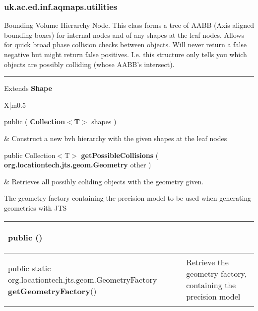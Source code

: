 \subsubsection*{ uk.ac.ed.inf.aqmaps.utilities }
 {\scriptsize Bounding Volume Hierarchy Node. This class forms a tree of AABB (Axis aligned bounding boxes) for internal nodes\newline%
 and of any shapes at the leaf nodes. Allows for quick broad phase collision checks between objects. Will never return a false negative but might return\newline%
 false positives. I.e. this structure only tells you which objects are possibly colliding (whose AABB's intersect).
 
\vspace*{4pt} \hrule \vspace*{3pt}
Extends \textbf{ Shape }
\vspace*{-5pt} 
\begin{tabularx}{\linewidth}{X|m{0.5\textwidth}}
\label{tab:BVHNode}
\begin{raggedleft}public  \textbf{\hyperref[tab:BVHNode]{\color{blue}{BVHNode}} }(\hspace*{ 5pt} \textbf{Collection$<$T$>$} shapes  )
\end{raggedleft} &
 Construct a new bvh hierarchy with the given shapes at the leaf nodes\\ \hline 
\begin{raggedleft}public Collection$<$T$>$ \textbf{getPossibleCollisions }(\hspace*{ 5pt} \textbf{org.locationtech.jts.geom.Geometry} other  )
\end{raggedleft} &
 Retrieves all possibly coliding objects with the geometry given.\\\end{tabularx}
}
 {\scriptsize The geometry factory containing the precision model to be used when generating geometries with JTS
 
\vspace*{-5pt} 
\begin{tabularx}{\linewidth}{X|m{}}
\label{tab:GeometryFactorySingleton}
\begin{raggedleft}public  \textbf{\hyperref[tab:GeometryFactorySingleton]{\color{blue}{GeometryFactorySingleton}}}()
\end{raggedleft} &
 \\ \hline 
\begin{raggedleft}public static org.locationtech.jts.geom.GeometryFactory \textbf{getGeometryFactory}()
\end{raggedleft} &
 Retrieve the geometry factory, containing the precision model\\\end{tabularx}
}
